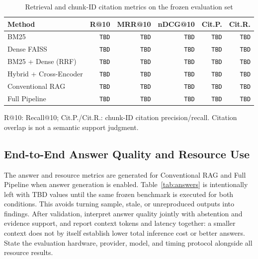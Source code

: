 \documentclass[conference]{IEEEtran}
\begin{document}
\begin{table}[t]
\centering
\caption{Retrieval and chunk-ID citation metrics on the frozen evaluation set}
\label{tab:retrieval}
\begin{tabular}{lrrrrr}
\toprule
Method & R@10 & MRR@10 & nDCG@10 & Cit.P. & Cit.R. \\
\midrule
BM25 & \texttt{TBD} & \texttt{TBD} & \texttt{TBD} & \texttt{TBD} & \texttt{TBD} \\
Dense FAISS & \texttt{TBD} & \texttt{TBD} & \texttt{TBD} & \texttt{TBD} & \texttt{TBD} \\
BM25 + Dense (RRF) & \texttt{TBD} & \texttt{TBD} & \texttt{TBD} & \texttt{TBD} & \texttt{TBD} \\
Hybrid + Cross-Encoder & \texttt{TBD} & \texttt{TBD} & \texttt{TBD} & \texttt{TBD} & \texttt{TBD} \\
Conventional RAG & \texttt{TBD} & \texttt{TBD} & \texttt{TBD} & \texttt{TBD} & \texttt{TBD} \\
Full Pipeline & \texttt{TBD} & \texttt{TBD} & \texttt{TBD} & \texttt{TBD} & \texttt{TBD} \\
\bottomrule
\end{tabular}

\vspace{1mm}
\footnotesize R@10: Recall@10; Cit.P./Cit.R.: chunk-ID citation
precision/recall. Citation overlap is not a semantic support judgment.
\end{table}

\subsection{End-to-End Answer Quality and Resource Use}
The answer and resource metrics are generated for Conventional RAG and Full
Pipeline when answer generation is enabled. Table~\ref{tab:answers} is
intentionally left with TBD values until the same frozen benchmark is
executed for both conditions. This avoids turning sample, stale, or
unreproduced outputs into findings. After validation, interpret answer
quality jointly with abstention and evidence support, and report context
tokens and latency together: a smaller context does not by itself establish
lower total inference cost or better answers. State the evaluation hardware,
provider, model, and timing protocol alongside all resource results.
\end{document}
